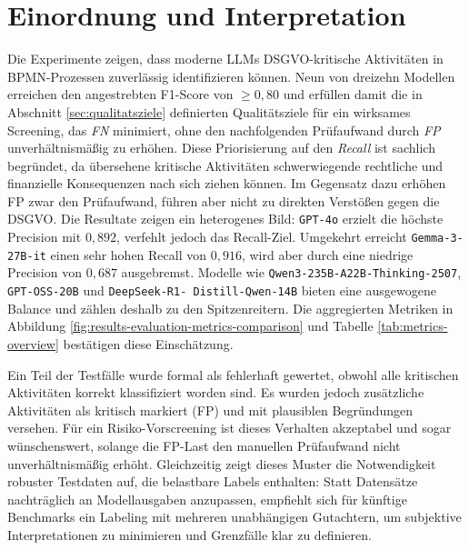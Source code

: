 \section{Einordnung und Interpretation}\label{sec:einordnung-und-interpretation}

Die Experimente zeigen, dass moderne \acp{LLM} \ac{DSGVO}-kritische Aktivitäten in \ac{BPMN}-Prozessen zuverlässig identifizieren können. Neun von dreizehn Modellen erreichen den angestrebten F1-Score von $\geq 0{,}80$ und erfüllen damit die in Abschnitt \ref{sec:qualitatsziele} definierten Qualitätsziele für ein wirksames Screening, das \emph{\ac{FN}} minimiert, ohne den nachfolgenden Prüfaufwand durch \emph{\ac{FP}} unverhältnismäßig zu erhöhen. Diese Priorisierung auf den \emph{Recall} ist sachlich begründet, da übersehene kritische Aktivitäten schwerwiegende rechtliche und finanzielle Konsequenzen nach sich ziehen können. Im Gegensatz dazu erhöhen \ac{FP} zwar den Prüfaufwand, führen aber nicht zu direkten Verstößen gegen die \ac{DSGVO}. Die Resultate zeigen ein heterogenes Bild: \texttt{GPT-4o} erzielt die höchste Precision mit $0{,}892$, verfehlt jedoch das Recall-Ziel. Umgekehrt erreicht \texttt{Gemma-3-27B-it} einen sehr hohen Recall von $0{,}916$, wird aber durch eine niedrige Precision von $0{,}687$ ausgebremst. Modelle wie \texttt{Qwen3-235B-A22B-Thinking-2507}, \texttt{GPT-OSS-20B} und \texttt{DeepSeek-R1-\linebreak~Distill-Qwen-14B} bieten eine ausgewogene Balance und zählen deshalb zu den Spitzenreitern. Die aggregierten Metriken in Abbildung \ref{fig:results-evaluation-metrics-comparison} und Tabelle \ref{tab:metrics-overview} bestätigen diese Einschätzung.

Ein Teil der Testfälle wurde formal als fehlerhaft gewertet, obwohl alle kritischen Aktivitäten korrekt klassifiziert worden sind. Es wurden jedoch zusätzliche Aktivitäten als kritisch markiert (\ac{FP}) und mit plausiblen Begründungen versehen. Für ein Risiko-Vorscreening ist dieses Verhalten akzeptabel und sogar wünschenswert, solange die \ac{FP}-Last den manuellen Prüfaufwand nicht unverhältnismäßig erhöht. Gleichzeitig zeigt dieses Muster die Notwendigkeit robuster Testdaten auf, die belastbare Labels enthalten: Statt Datensätze nachträglich an Modellausgaben anzupassen, empfiehlt sich für künftige Benchmarks ein Labeling mit mehreren unabhängigen Gutachtern, um subjektive Interpretationen zu minimieren und Grenzfälle klar zu definieren.
